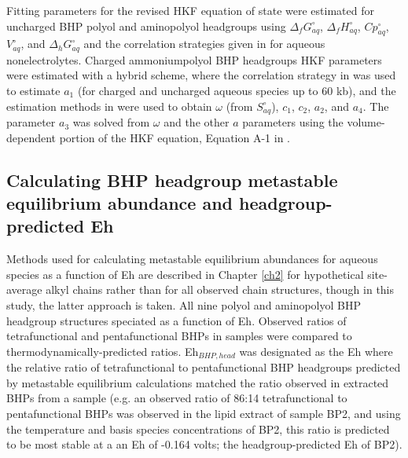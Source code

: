 Fitting parameters for the revised HKF equation of state were estimated for uncharged BHP polyol and aminopolyol headgroups using $\Delta_{f}G^{\circ}_{aq}$, $\Delta_{f}H^{\circ}_{aq}$, $Cp^{\circ}_{aq}$, $V^{\circ}_{aq}$, and $\Delta_{h}G^{\circ}_{aq}$ and the correlation strategies given in \cite{plyasunov2001correlation} for aqueous nonelectrolytes. Charged ammoniumpolyol BHP headgroups HKF parameters were estimated with a hybrid scheme, where the correlation strategy in \cite{sverjensky2014water} was used to estimate $a_{1}$ (for charged and uncharged aqueous species up to 60 kb), and the estimation methods in \cite{shock1990calculation} were used to obtain $\omega$ (from $S^{\circ}_{aq}$), $c_{1}$, $c_{2}$, $a_{2}$, and $a_{4}$. The parameter $a_{3}$ was solved from $\omega$ and the other $a$ parameters using the volume-dependent portion of the HKF equation, Equation A-1 in \cite{tanger1988calculation}.

\subsection{Calculating BHP headgroup metastable equilibrium abundance and headgroup-predicted Eh}

Methods used for calculating metastable equilibrium abundances for aqueous species as a function of Eh are described in Chapter \ref{ch2} for hypothetical site-average alkyl chains rather than for all observed chain structures, though in this study, the latter approach is taken. All nine polyol and aminopolyol BHP headgroup structures speciated as a function of Eh. Observed ratios of tetrafunctional and pentafunctional BHPs in samples were compared to thermodynamically-predicted ratios. Eh$_{BHP, head}$ was designated as the Eh where the relative ratio of tetrafunctional to pentafunctional BHP headgroups predicted by metastable equilibrium calculations matched the ratio observed in extracted BHPs from a sample (e.g. an observed ratio of 86:14 tetrafunctional to pentafunctional BHPs was observed in the lipid extract of sample BP2, and using the temperature and basis species concentrations of BP2, this ratio is predicted to be most stable at a an Eh of -0.164 volts; the headgroup-predicted Eh of BP2).



